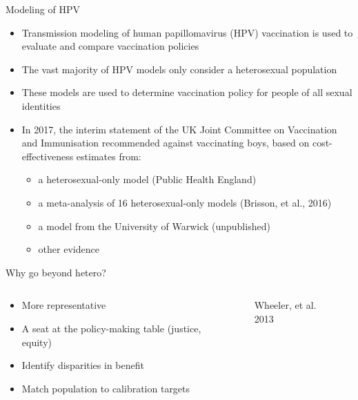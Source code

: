 \documentclass[aspectratio=169]{beamer}
\begin{document}
\begin{frame}{Modeling of HPV}
    \begin{itemize}
        \item Transmission modeling of human papillomavirus (HPV)  vaccination is used to evaluate and compare vaccination policies
        \pause
        \item The vast majority of HPV models only consider a heterosexual population
        \pause
        \item These models are used to determine vaccination policy for people of all sexual identities
        \pause
        \item In 2017, the interim statement of the UK Joint Committee on Vaccination and Immunisation recommended against vaccinating boys, based on cost-effectiveness estimates from:
        \pause
        \begin{itemize}
            \item a heterosexual-only model (Public Health England)
            \pause
            \item a meta-analysis of 16 heterosexual-only models (Brisson, et al., 2016)
            \pause
            \item a model from the University of Warwick (unpublished) \pause
            \item other evidence
        \end{itemize}
    \end{itemize}
\end{frame}






\begin{frame}{Why go beyond hetero?}
\begin{columns}
    \begin{column}{0.5\textwidth}
        \begin{itemize}
            \item More representative \pause
            \item A seat at the policy-making table (justice, equity) \pause
            \item Identify disparities in benefit \pause
            \item Match population to calibration targets
        \end{itemize}
    \end{column}
    \begin{column}{0.5\textwidth}
        \begin{figure}
            \caption{Wheeler, et al. 2013}
        \end{figure}
    \end{column}
\end{columns}
\end{frame}
\end{document}
